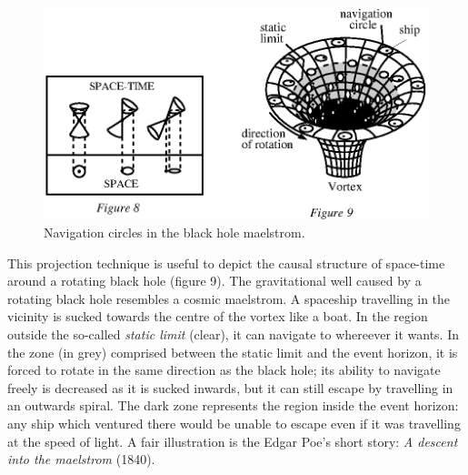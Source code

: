 \documentclass[12pt]{article}
\begin{document}
\begin{figure}[tb]
\renewcommand \thefigure {8\&9}
  \begin{center}
    \leavevmode
    \includegraphics{vortex.ps}
    \caption{Navigation circles in the black hole maelstrom.}
  \end{center}
\end{figure}
\setcounter{figure}{9}
This projection
technique is useful to depict the causal structure of space-time around a
rotating black hole (figure 9). The gravitational well caused by a rotating
black hole resembles a cosmic maelstrom. A spaceship travelling in the vicinity is
sucked towards the centre of the vortex like a boat. In the region outside
the so-called {\it static limit} (clear), it can navigate 
to whereever it wants.
In the zone (in grey) comprised between the static limit and the event
horizon, it
is forced to rotate in the same direction as the black hole; its ability to
navigate freely is decreased as it is sucked inwards, but it can still escape
by travelling in an outwards spiral. The dark zone represents the region inside
the event horizon: any ship which ventured there would be unable to escape even
if it was travelling at the speed of light. A fair illustration is the 
Edgar Poe's short
story: {\it A descent into the maelstrom} (1840).
\end{document}
